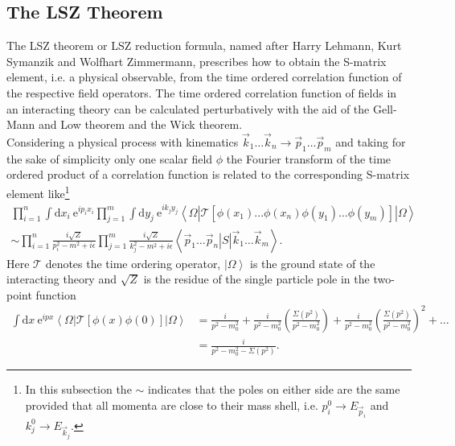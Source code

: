 \subsection{The LSZ Theorem}\label{sec:LSZ}
The LSZ theorem\cite{Lehmann:1954rq} or LSZ reduction formula, named after  Harry Lehmann, Kurt Symanzik and Wolfhart Zimmermann, prescribes how to obtain the S-matrix element, i.e. a physical observable, from the time ordered correlation function of the respective field operators. The time ordered correlation function of fields in an interacting theory can be calculated perturbatively with the aid of the Gell-Mann and Low theorem and the Wick theorem. \\
Considering a physical process with kinematics $\vec{k}_1 \hdots \vec{k}_n \to \vec{p}_1 \hdots \vec{p}_m$ and taking for the sake of simplicity only one scalar field $\phi$ the Fourier transform of the time ordered product of a correlation function is related to the corresponding S-matrix element like\footnote{In this subsection the $\sim$ indicates that the poles on either side are the same provided that all momenta are close to their mass shell, i.e. $p_i^0 \to E_{\vec{p}_i}$ and $k_j^0 \to E_{\vec{k}_j}$.}
\begin{align}
\prod_{i=1}^n \int \mathrm{d}x_i\ \mathrm{e}^{ip_i x_i} \prod_{j=1}^m \int \mathrm{d}y_j\ \mathrm{e}^{ik_j y_j} \left\langle \Omega | \mathcal{T} \left[ \phi(x_1) \hdots \phi(x_n) \phi(y_1) \hdots \phi(y_m) \right] | \Omega\right\rangle \nonumber\\
\sim \prod_{i=1}^n \frac{i\sqrt{Z}}{p_i^2 - m^2 + i\epsilon} \prod_{j=1}^m \frac{i\sqrt{Z}}{k_j^2 - m^2 + i\epsilon} \left\langle \left.\left.\vec{p}_1 \hdots \vec{p}_n \right| S \right| \vec{k}_1 \hdots \vec{k}_m \right\rangle .\label{eq:LSZ}
\end{align}
Here $\mathcal{T}$ denotes the time ordering operator, $\left.| \Omega \right\rangle$ is the ground state of the interacting theory and $\sqrt{Z}$ is the residue of the single particle pole in the two-point function 
\begin{align}
\int \mathrm{d}x\ \mathrm{e}^{ip x} \left\langle \Omega | \mathcal{T} \left[ \phi(x) \phi(0) \right] | \Omega\right\rangle &= \frac{i}{p^2-m_0^2} + \frac{i}{p^2-m_0^2} \left(\frac{\Sigma(p^2)}{p^2-m_0^2}\right) + \frac{i}{p^2-m_0^2} \left(\frac{\Sigma(p^2)}{p^2-m_0^2}\right)^2 + \hdots\nonumber\\
&= \frac{i}{p^2 - m_0^2 - \Sigma(p^2)}.\label{eq:propagator}
\end{align}
